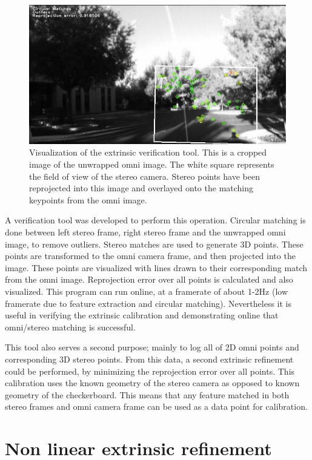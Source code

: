\begin{figure}[h!]
  \centering
    \includegraphics[width=1.0\textwidth]{chapters/images/circ_matches}
  \caption{Visualization of the extrinsic verification tool. This is a cropped image of the unwrapped omni image.  The white square represents the field of view of the stereo camera.  Stereo points have been reprojected into this image and overlayed onto the matching keypoints from the omni image. }
  \label{fig:circ_matches}
\end{figure}

A verification tool was developed to perform this operation.  Circular matching is done between left stereo frame, right stereo frame and the unwrapped omni image, to remove outliers.  Stereo matches are used to generate 3D points.  These points are transformed to the omni camera frame, and then projected into the image.  These points are visualized with lines drawn to their corresponding match from the omni image.  Reprojection error over all points is calculated and also visualized.  This program can run online, at a framerate of about 1-2Hz (low framerate due to feature extraction and circular matching).  Nevertheless it is useful in verifying the extrinsic calibration and demonstrating online that omni/stereo matching is successful.

This tool also serves a second purpose; mainly to log all of 2D omni points and corresponding 3D stereo points.  From this data, a second extrinsic refinement could be performed, by minimizing the reprojection error over all points.  This calibration uses the known geometry of the stereo camera as opposed to known geometry of the checkerboard.  This means that any feature matched in both stereo frames and omni camera frame can be used as a data point for calibration.

\section{Non linear extrinsic refinement}

